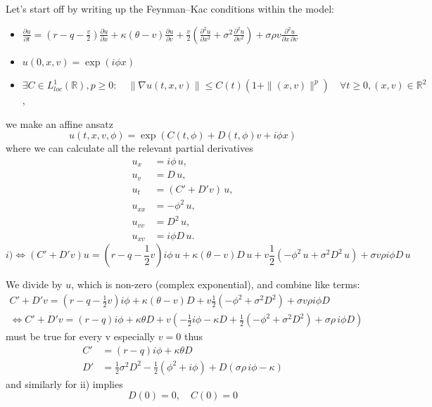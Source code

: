 Let's start off by writing up the Feynman--Kac conditions within the model:

\begin{itemize}
\item[i)]
$\frac{\partial u}{\partial t} = \left(r-q-\frac{v}{2}\right)\frac{\partial u}{\partial x}
  +\kappa(\theta-v)\frac{\partial u}{\partial v}
  +\frac{v}{2}\!\left(\frac{\partial^2 u}{\partial x^2}+\sigma^2\frac{\partial^2 u}{\partial v^2}\right)
  +\sigma\rho v\frac{\partial^2 u}{\partial x\,\partial v}$
\item[ii)] $u(0, x, v) = \exp(i\phi x)$
\item[iii)] $\exists C\in L^1_{loc}(\mathbb{R}),p\geq 0:\quad  \|\nabla u(t, x, v)\| \leq C(t)\left(1 + \|(x,v)\|^p\right)\quad \forall t\geq 0, (x,v)\in \mathbb{R}^2$,
\end{itemize}
we make an affine ansatz
\begin{equation}u(t,x,v,\phi)= \exp(C(t,\phi)+D(t,\phi)v+i\phi x)\end{equation}
where we can calculate all the relevant partial derivatives
\begin{equation}
\begin{aligned}
u_x &= i\phi \,u, \\
u_v &= D\,u, \\
u_t &= (C' + D'v)\,u, \\
u_{xx} &= -\phi^2\,u, \\
u_{vv} &= D^2\,u, \\
u_{xv} &= i\phi D\,u.
\end{aligned}
\end{equation}
\begin{equation}i)\Leftrightarrow (C'+D'v)u= (r-q-\frac{1}{2}v)i\phi \,u+\kappa(\theta-v)D\,u+v\frac{1}{2}(-\phi^2\,u+\sigma^2 D^2\,u)+\sigma v\rho i\phi D\,u\end{equation}

We divide by $u$, which is non-zero (complex exponential), and combine like terms:
\begin{align}
C'+D'v = (r-q-\frac{1}{2}v)i\phi +\kappa(\theta-v)D+v\frac{1}{2}(-\phi^2+\sigma^2 D^2)+\sigma v\rho i\phi D\\
\Leftrightarrow C' + D'v=(r-q)i\phi + \kappa\theta D+v\left(-\frac{1}{2}i\phi-\kappa D+\frac{1}{2}(-\phi^2 + \sigma^2 D^2)+\sigma \rho\, i\phi D\right)
\end{align}
must be true for every v especially $v=0$ thus
\begin{align}
C' &=(r-q) i \phi+\kappa\theta D\\
D' &= \frac{1}{2}\sigma^2 D^2-\frac{1}{2}(\phi^2 + i\phi)+D(\sigma \rho\, i\phi -\kappa)
\end{align}
and similarly for ii) implies
\begin{equation}D(0)=0, \quad C(0)=0\end{equation}

